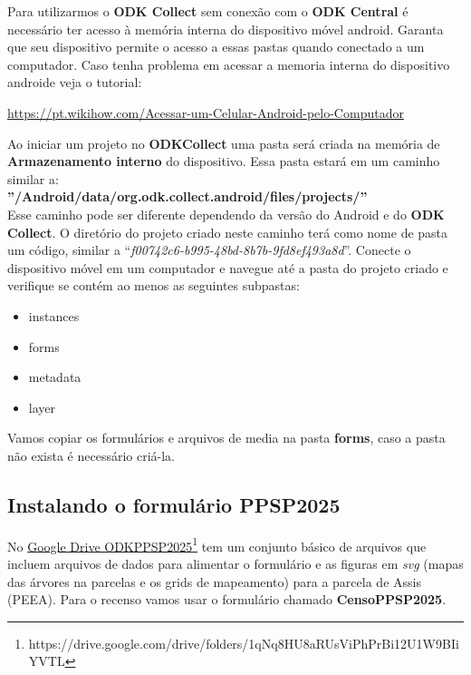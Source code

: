 Para utilizarmos o \textbf{ODK Collect} sem conexão com o \textbf{ODK Central} é necessário ter acesso à memória interna do dispositivo móvel android. Garanta que seu dispositivo permite o acesso a essas pastas quando conectado a um computador. Caso tenha problema em acessar a memoria interna do dispositivo androide veja o tutorial:

\url{https://pt.wikihow.com/Acessar-um-Celular-Android-pelo-Computador} 

Ao iniciar um projeto no \textbf{ODKCollect} uma pasta será criada na memória de \textbf{Armazenamento interno} do dispositivo. Essa pasta estará em um caminho similar a:\\

\textbf{''/Android/data/org.odk.collect.android/files/projects/''}\\

Esse caminho pode ser diferente dependendo da versão do Android e do \textbf{ODK Collect}. O diretório do projeto criado neste caminho terá como nome de pasta um código, similar a ``\textit{f00742c6-b995-48bd-8b7b-9fd8ef493a8d}''.  Conecte o dispositivo móvel em um computador e navegue até a pasta do projeto criado e verifique se contém ao menos as seguintes subpastas:

\begin{itemize}
\item instances
\item forms
\item metadata
\item layer
\end{itemize}




Vamos copiar os formulários e arquivos de media na pasta  \textbf{forms}, caso a pasta não exista é necessário criá-la. 

\subsection{Instalando o formulário PPSP2025}
\label{sec:instalando_o_formulario_peic}

No \href{https://drive.google.com/drive/folders/1qNq8HU8aRUsViPhPrBi12U1W9BIiYVTL?usp=sharing}{Google Drive ODKPPSP2025}\footnote{https://drive.google.com/drive/folders/1qNq8HU8aRUsViPhPrBi12U1W9BIiYVTL} tem um conjunto básico de arquivos que incluem arquivos de dados para alimentar o formulário e as figuras em \textit{svg} (mapas das árvores na parcelas e os grids de mapeamento) para a parcela de Assis (PEEA). Para o recenso vamos usar o formulário chamado \textbf{CensoPPSP2025}.

